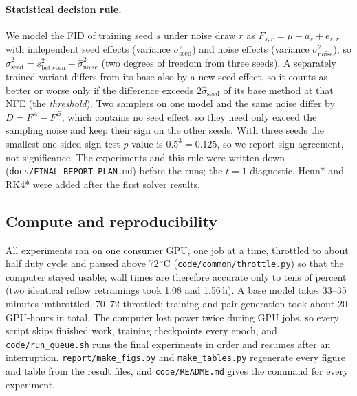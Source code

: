 \paragraph{Statistical decision rule.} We model the FID of training seed $s$ under noise draw $r$ as $F_{s,r}=\mu+a_s+e_{s,r}$ with independent seed effects (variance $\sigma^2_{\text{seed}}$) and noise effects (variance $\sigma^2_{\text{noise}}$), so $\hat\sigma^2_{\text{seed}}=s^2_{\text{between}}-\hat\sigma^2_{\text{noise}}$ (two degrees of freedom from three seeds). A separately trained variant differs from its base also by a new seed effect, so it counts as better or worse only if the difference exceeds $2\hat\sigma_{\text{seed}}$ of its base method at that NFE (the \emph{threshold}). Two samplers on one model and the same noise differ by $D=F^A-F^B$, which contains no seed effect, so they need only exceed the sampling noise and keep their sign on the other seeds. With three seeds the smallest one-sided sign-test $p$-value is $0.5^3=0.125$, so we report sign agreement, not significance. The experiments and this rule were written down (\texttt{docs/FINAL\_REPORT\_PLAN.md}) before the runs; the $t=1$ diagnostic, Heun* and RK4* were added after the first solver results.

\subsection{Compute and reproducibility}\label{sec:compute}
All experiments ran on one consumer GPU, one job at a time, throttled to about half duty cycle and paused above 72\,$^\circ$C (\texttt{code/common/throttle.py}) so that the computer stayed usable; wall times are therefore accurate only to tens of percent (two identical reflow retrainings took 1.08 and 1.56\,h). A base model takes 33--35 minutes unthrottled, 70--72 throttled; training and pair generation took about 20 GPU-hours in total. The computer lost power twice during GPU jobs, so every script skips finished work, training checkpoints every epoch, and \texttt{code/run\_queue.sh} runs the final experiments in order and resumes after an interruption. \texttt{report/make\_figs.py} and \texttt{make\_tables.py} regenerate every figure and table from the result files, and \texttt{code/README.md} gives the command for every experiment. %
